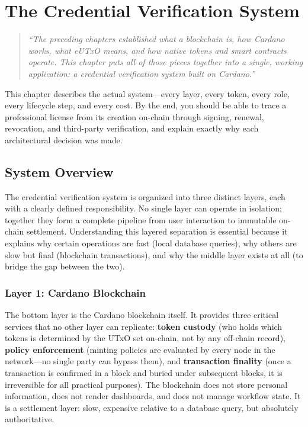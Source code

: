 
\chapter{The Credential Verification System}
\label{ch:credential-system}

\begin{quote}
\textit{``The preceding chapters established what a blockchain is, how Cardano works, what eUTxO means, and how native tokens and smart contracts operate. This chapter puts all of those pieces together into a single, working application: a credential verification system built on Cardano.''}
\end{quote}

\bigskip

This chapter describes the actual system---every layer, every token, every role, every lifecycle step, and every cost. By the end, you should be able to trace a professional license from its creation on-chain through signing, renewal, revocation, and third-party verification, and explain exactly why each architectural decision was made.

\section{System Overview}
\label{sec:ch5-overview}

The credential verification system is organized into three distinct layers, each with a clearly defined responsibility. No single layer can operate in isolation; together they form a complete pipeline from user interaction to immutable on-chain settlement. Understanding this layered separation is essential because it explains why certain operations are fast (local database queries), why others are slow but final (blockchain transactions), and why the middle layer exists at all (to bridge the gap between the two).

\subsection{Layer 1: Cardano Blockchain}

The bottom layer is the Cardano blockchain itself. It provides three critical services that no other layer can replicate: \textbf{token custody} (who holds which tokens is determined by the UTxO set on-chain, not by any off-chain record), \textbf{policy enforcement} (minting policies are evaluated by every node in the network---no single party can bypass them), and \textbf{transaction finality} (once a transaction is confirmed in a block and buried under subsequent blocks, it is irreversible for all practical purposes). The blockchain does not store personal information, does not render dashboards, and does not manage workflow state. It is a settlement layer: slow, expensive relative to a database query, but absolutely authoritative.

